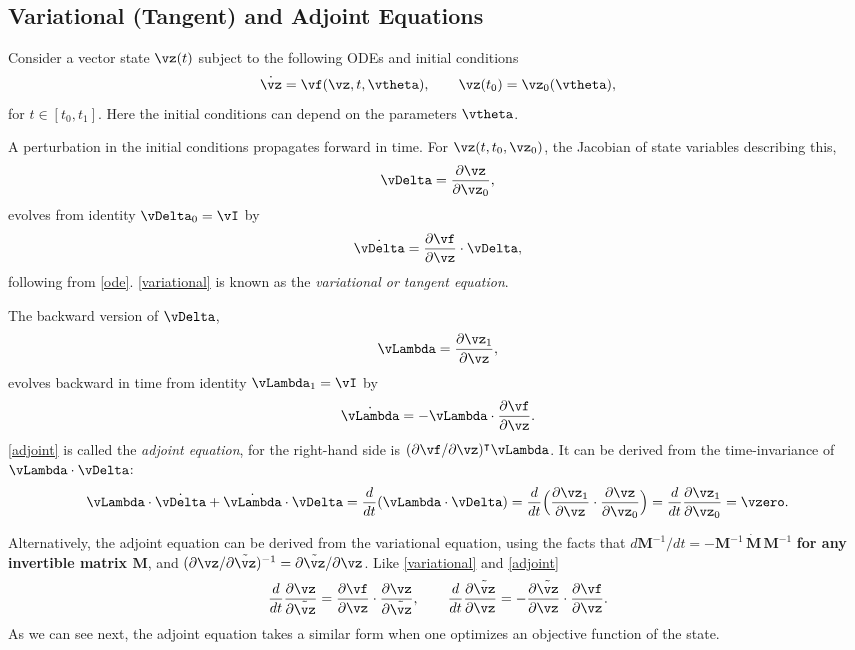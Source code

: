 \documentclass[modern, dvipsnames]{aastex631}
\renewcommand{\d}{d}
\newcommand{\p}{\partial}
\newcommand{\HL}[1]{\textcolor{Bittersweet}{\textbf{#1}}}
\begin{document}
\vspace{1em}
\subsection{Variational (Tangent) and Adjoint Equations}

Consider a vector state $\vz(t)$ subject to the following ODEs and
initial conditions
%
\begin{equation}
\dot\vz = \vf(\vz, t, \vtheta),
\qquad
\vz(t_0) = \vz_0(\vtheta),
\label{ode}
\end{equation}
%
for $t \in [t_0, t_1]$.
Here the initial conditions can depend on the parameters $\vtheta$.

A perturbation in the initial conditions propagates forward in time.
For $\vz(t, t_0, \vz_0)$, the Jacobian of state variables describing
this,
%
\begin{equation}
\vDelta = \frac{\p\vz}{\p\vz_0},
\end{equation}
%
evolves from identity $\vDelta_0 = \vI$ by
%
\begin{equation}
\dot\vDelta = \frac{\p\vf}{\p\vz} \cdot \vDelta,
\label{variational}
\end{equation}
%
following from \eqref{ode}.
\eqref{variational} is known as the \emph{variational or tangent
equation}.

The backward version of $\vDelta$,
%
\begin{equation}
\vLambda = \frac{\p\vz_1}{\p\vz},
\end{equation}
%
evolves backward in time from identity $\vLambda_1 = \vI$ by
%
\begin{equation}
\dot\vLambda = - \vLambda \cdot \frac{\p\vf}{\p\vz}.
\label{adjoint}
\end{equation}
%
\eqref{adjoint} is called the \emph{adjoint equation}, for the
right-hand side is $(\p\vf / \p\vz)^\intercal \vLambda$.
It can be derived from the time-invariance of $\vLambda \cdot \vDelta$:
%
\begin{equation}
\vLambda \cdot \dot\vDelta + \dot\vLambda \cdot \vDelta
= \frac\d{\d t} (\vLambda \cdot \vDelta)
= \frac\d{\d t} \Bigl( \frac{\p\vz_1}{\p\vz}
  \cdot \frac{\p\vz}{\p\vz_0} \Bigr)
= \frac\d{\d t} \frac{\p\vz_1}{\p\vz_0}
= \vzero.
\end{equation}

Alternatively, the adjoint equation can be derived from the variational
equation, using the facts that $\d \bm{M}^{-1} / \d t = - \bm{M}^{-1} \,
\dot{\bm{M}} \, \bm{M}^{-1}$ \HL{for any invertible matrix $\bm{M}$}, and
$(\p\vz / \p\tilde\vz)^{-1} = \p\tilde\vz / \p\vz$.
Like \eqref{variational} and \eqref{adjoint}
%
\begin{equation}
\frac\d{\d t} \frac{\p\vz}{\p\tilde\vz}
= \frac{\p\vf}{\p\vz} \cdot \frac{\p\vz}{\p\tilde\vz},
\qquad
\frac\d{\d t} \frac{\p\tilde\vz}{\p\vz}
= - \frac{\p\tilde\vz}{\p\vz} \cdot \frac{\p\vf}{\p\vz}.
\end{equation}
%
As we can see next, the adjoint equation takes a similar form when one
optimizes an objective function of the state.
\end{document}
